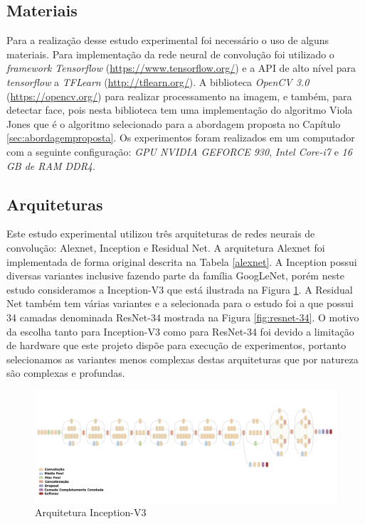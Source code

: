 \subsection{Materiais}\label{sec:material}
Para a realização desse estudo experimental foi necessário o uso de alguns materiais. Para implementação da rede neural de convolução foi utilizado o \textit{framework Tensorflow} (\url{https://www.tensorflow.org/}) e a API de alto nível para \textit{tensorflow} a \textit{TFLearn} (\url{http://tflearn.org/}). A biblioteca \textit{OpenCV 3.0} (\url{https://opencv.org/}) para realizar processamento na imagem, e também, para detectar face, pois nesta biblioteca tem uma implementação do algoritmo Viola Jones que é o algoritmo selecionado para a abordagem proposta no Capítulo \ref{sec:abordagemproposta}.
Os experimentos foram realizados em um computador com a seguinte configuração: \textit{GPU NVIDIA GEFORCE 930}, \textit{Intel Core-i7} e \textit{16 GB de RAM DDR4}. 


\subsection{Arquiteturas}
Este estudo experimental utilizou três arquiteturas de redes neurais de convolução: Alexnet, Inception e Residual Net. A arquitetura Alexnet foi implementada de forma original descrita na Tabela \ref{alexnet}.  A Inception possui diversas variantes inclusive fazendo parte da família GoogLeNet, porém neste estudo consideramos a Inception-V3 que está ilustrada na Figura \ref{fig:inceptionV3}. A Residual Net também tem várias variantes e a selecionada para o estudo foi a que possui 34 camadas denominada ResNet-34 mostrada na Figura \ref{fig:resnet-34}. O motivo da escolha tanto para Inception-V3 como para ResNet-34  
foi devido a limitação de hardware que este projeto dispõe para execução de experimentos, portanto selecionamos as variantes menos complexas destas arquiteturas que por natureza são complexas e profundas. 

\begin{figure}
\centering
\includegraphics[scale=0.33]{figuras/inceptionV3.png}
\caption{Arquitetura Inception-V3}
\label{fig:inceptionV3}
\end{figure}

